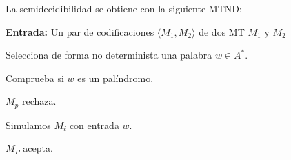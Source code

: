 \begin{ejercicio}
\begin{itemize}
        La semidecidibilidad se obtiene con la siguiente MTND:

        \begin{algorithm}
            \caption{MTND $M_{P}$}
            \label{algorithm:palindromo-simultaneo-semidecidible}
            \begin{algorithmic}
                \State \textbf{Entrada:} Un par de codificaciones $\langle M_1, M_2 \rangle$ de dos MT $M_1$ y $M_2$

                \State Selecciona de forma no determinista una palabra $w \in A^{*}$.

                \State Comprueba si $w$ es un palíndromo.

                    \State $M_p$ rechaza.
                \EndIf

                    \State Simulamos $M_i$ con entrada $w$.
                \EndFor

                    \State $M_{P}$ acepta.
                \EndIf
            \end{algorithmic}
        \end{algorithm}

    \end{itemize}
\end{ejercicio}





